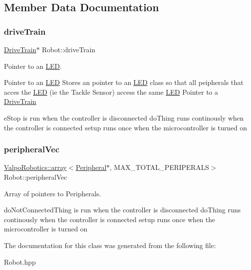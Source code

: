 \subsection{Member Data Documentation}
\mbox{\label{class_robot_a4b499841182a38720a26a493fa98363a}} 
\subsubsection{\texorpdfstring{drive\+Train}{driveTrain}}
{\footnotesize\ttfamily \mbox{\hyperlink{class_drive_train}{Drive\+Train}}$\ast$ Robot\+::drive\+Train\hspace{0.3cm}{\ttfamily [protected]}}



Pointer to an \mbox{\hyperlink{class_l_e_d}{L\+ED}}. 

Pointer to an \mbox{\hyperlink{class_l_e_d}{L\+ED}} Stores an pointer to an \mbox{\hyperlink{class_l_e_d}{L\+ED}} class so that all peipherals that acces the \mbox{\hyperlink{class_l_e_d}{L\+ED}} (ie the Tackle Sensor) access the same \mbox{\hyperlink{class_l_e_d}{L\+ED}} Pointer to a \mbox{\hyperlink{class_drive_train}{Drive\+Train}}

e\+Stop is run when the controller is disconnected do\+Thing runs continously when the controller is connected setup runs once when the microcontroller is turned on \mbox{\label{class_robot_a8db438771a3e7dc9d2cf5dd2e1d25f74}} 
\subsubsection{\texorpdfstring{peripheral\+Vec}{peripheralVec}}
{\footnotesize\ttfamily \mbox{\hyperlink{class_valpo_robotics_1_1array}{Valpo\+Robotics\+::array}}$<$\mbox{\hyperlink{class_peripheral}{Peripheral}}$\ast$, M\+A\+X\+\_\+\+T\+O\+T\+A\+L\+\_\+\+P\+E\+R\+I\+P\+E\+R\+A\+LS$>$ Robot\+::peripheral\+Vec\hspace{0.3cm}{\ttfamily [protected]}}



Array of pointers to Peripherals. 

do\+Not\+Connected\+Thing is run when the controller is disconnected do\+Thing runs continously when the controller is connected setup runs once when the microcontroller is turned on 

The documentation for this class was generated from the following file\+:\begin{DoxyCompactItemize}
\item 
Robot.\+hpp\end{DoxyCompactItemize}
